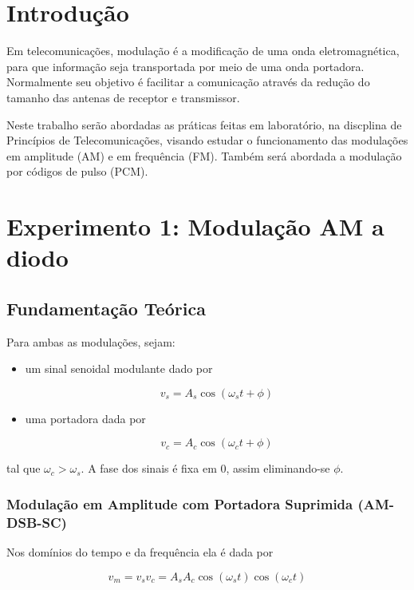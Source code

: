 \documentclass[]{report}
\title{}
\begin{document}

\tableofcontents

\chapter{Introdução}

Em telecomunicações, modulação é a modificação de uma onda eletromagnética, para que informação seja transportada por meio de uma onda portadora. Normalmente seu objetivo é facilitar a comunicação através da redução do tamanho das antenas de receptor e transmissor.

Neste trabalho serão abordadas as práticas feitas em laboratório, na discplina de Princípios de Telecomunicações, visando estudar o funcionamento das modulações em amplitude (AM) e em frequência (FM). Também será abordada a modulação por códigos de pulso (PCM). 

\chapter{Experimento 1: Modulação AM a diodo}
\section{Fundamentação Teórica}
Para ambas as modulações, sejam:

\begin{itemize}
\item um sinal senoidal modulante dado por 

\begin{equation}\label{eq_modulante}
v_s = A_s \cos(\omega_s t + \phi)
\end{equation}

\item uma portadora dada por

\begin{equation}\label{eq_portadora}
v_c = A_c \cos(\omega_c t + \phi)
\end{equation}
\end{itemize}
tal que $\omega_c > \omega_s$. A fase dos sinais é fixa em $0$, assim eliminando-se $\phi$. 

\subsection{Modulação em Amplitude com Portadora Suprimida (AM-DSB-SC)}
Nos domínios do tempo e da frequência ela é dada por

\begin{equation}\label{eq_am_dsb_sc_tempo}
v_m = v_s v_c = A_s A_c \cos(\omega_s t) \cos(\omega_c t)
\end{equation}
\end{document}
